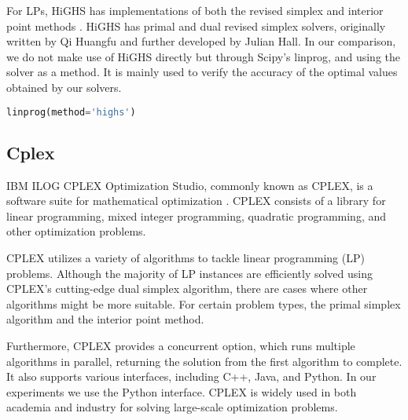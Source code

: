 For LPs, HiGHS has implementations of both the revised simplex and interior point methods
\parencite{Huangfu2018}.
HiGHS has primal and
dual revised simplex solvers, originally written by Qi Huangfu and
further developed by Julian Hall.
In our comparison, we do not make use of HiGHS directly but through Scipy's linprog, and using the solver as a method. It is mainly used to verify the accuracy of the optimal values
obtained by our solvers.

\begin{lstlisting}[language=Python]
    linprog(method='highs')
\end{lstlisting}

\subsection{Cplex}
IBM ILOG CPLEX Optimization Studio, commonly known as CPLEX,
is a software suite for mathematical optimization \parencite{cplex2009v12}.
CPLEX consists of a library for linear programming,
mixed integer programming, quadratic programming, and other optimization problems.

CPLEX utilizes a variety of algorithms to tackle linear programming (LP) problems.
Although the majority of LP instances are efficiently solved using CPLEX's
cutting-edge dual simplex algorithm, there are cases where other algorithms might be more suitable.
For certain problem types, the primal simplex algorithm and the interior point method.

Furthermore, CPLEX provides a concurrent option, which runs multiple algorithms in parallel,
returning the solution from the first algorithm to complete.
It also supports various interfaces, including C++, Java, and Python. In our experiments
we use the Python interface.
CPLEX is widely used in both academia and industry for solving large-scale optimization
problems.
